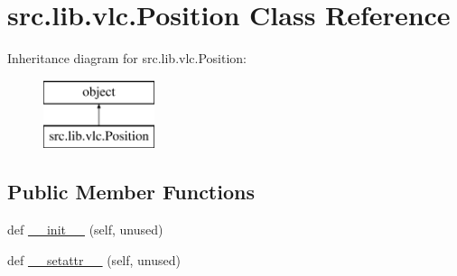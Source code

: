 \hypertarget{classsrc_1_1lib_1_1vlc_1_1Position}{}\section{src.\+lib.\+vlc.\+Position Class Reference}
\label{classsrc_1_1lib_1_1vlc_1_1Position}
Inheritance diagram for src.\+lib.\+vlc.\+Position\+:\begin{figure}[H]
\begin{center}
\leavevmode
\includegraphics[height=2.000000cm]{classsrc_1_1lib_1_1vlc_1_1Position}
\end{center}
\end{figure}
\subsection*{Public Member Functions}
\begin{DoxyCompactItemize}
\item 
def \hyperlink{classsrc_1_1lib_1_1vlc_1_1Position_aff6d8088b0c575264cda6ce64d2d4a0d}{\+\_\+\+\_\+init\+\_\+\+\_\+} (self, unused)
\item 
def \hyperlink{classsrc_1_1lib_1_1vlc_1_1Position_ade091a758dbe1bb2acbf9e9ae7c395a9}{\+\_\+\+\_\+setattr\+\_\+\+\_\+} (self, unused)
\end{DoxyCompactItemize}
